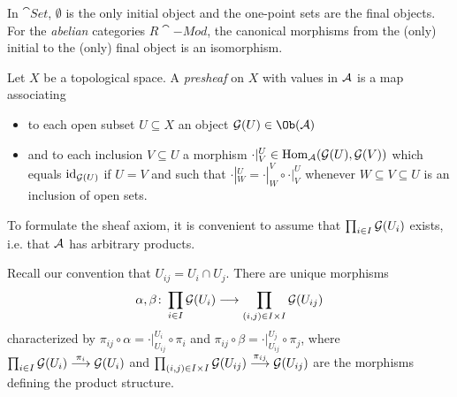 \documentclass[a4paper,parskip=half,numbers=enddot, DIV=12]{scrreprt}
\begin{document}
  \begin{rem*}
  	In $\cat{Set}$, $\emptyset$ is the only initial object and the one-point sets are the final objects. For the \emph{abelian} categories $R\cat{-Mod}$, the canonical morphisms from the (only) initial to the (only) final object is an isomorphism.
  \end{rem*}
	Let $X$ be a topological space. A \emph{presheaf} on $X$ with values in $\mathcal{A}$ is a map associating
	\begin{itemize}
		\item to each open subset $U\subseteq X$ an object $\Gg(U)\in\Ob(\Aa)$
		\item and to each inclusion $V\subseteq U$ a morphism $\cdot|_V^U\in\operatorname{Hom}_{\mathcal{A}}(\mathcal{G}(U), \mathcal{G}(V))$ which equals $\operatorname{id}_{\mathcal{G}(U)}$ if $U=V$ and such that $\cdot|_W^U=\cdot|_W^V\circ\cdot|_V^U$ whenever $W\subseteq V\subseteq U$ is an inclusion of open sets.
	\end{itemize}
	To formulate the sheaf axiom, it is convenient to assume that $\prod_{i\in I}\mathcal{G}(U_i)$ exists, i.e. that $\mathcal{A}$ has arbitrary products.
	
	Recall our convention that $U_{ij}=U_i\cap U_j$. There are unique morphisms
	\begin{align*}
		\alpha,\beta\colon \prod_{i\in I}\mathcal{G}(U_i)\longrightarrow\prod_{(i,j)\in I\times I}\mathcal{G}(U_{ij})
	\end{align*}
	characterized by $\pi_{ij}\circ\alpha=\cdot|_{U_{ij}}^{U_i}\circ\pi_i$ and $\pi_{ij}\circ\beta=\cdot|_{U_{ij}}^{U_j}\circ\pi_j$, where $\prod_{i\in I}\Gg(U_i)\morphism[\pi_i]\Gg(U_i)$ and $\prod_{(i,j)\in I\times I}\Gg(U_{ij})\morphism[\pi_{ij}]\Gg(U_{ij})$ are the morphisms defining the product structure.
	
\end{document}
